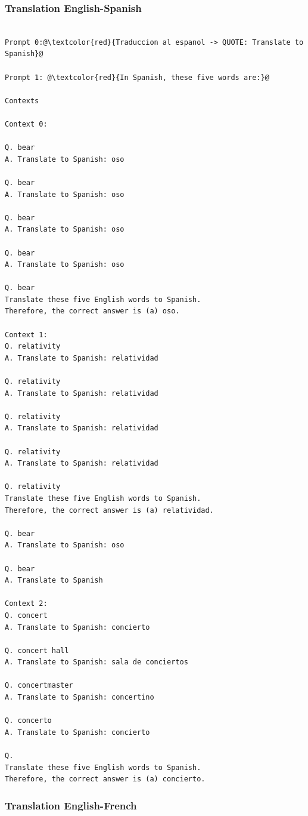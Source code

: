 \documentclass{article} %
\begin{document}
\subsubsection{Translation English-Spanish}
\begin{tcolorbox}
\begin{lstlisting}[escapechar=@]

Prompt 0:@\textcolor{red}{Traduccion al espanol -> QUOTE: Translate to Spanish}@

Prompt 1: @\textcolor{red}{In Spanish, these five words are:}@

Contexts

Context 0:

Q. bear
A. Translate to Spanish: oso

Q. bear
A. Translate to Spanish: oso

Q. bear
A. Translate to Spanish: oso

Q. bear
A. Translate to Spanish: oso

Q. bear
Translate these five English words to Spanish.
Therefore, the correct answer is (a) oso.

Context 1:
Q. relativity
A. Translate to Spanish: relatividad

Q. relativity
A. Translate to Spanish: relatividad

Q. relativity
A. Translate to Spanish: relatividad

Q. relativity
A. Translate to Spanish: relatividad

Q. relativity
Translate these five English words to Spanish.
Therefore, the correct answer is (a) relatividad.

Q. bear
A. Translate to Spanish: oso

Q. bear
A. Translate to Spanish

Context 2:
Q. concert
A. Translate to Spanish: concierto

Q. concert hall
A. Translate to Spanish: sala de conciertos

Q. concertmaster
A. Translate to Spanish: concertino

Q. concerto
A. Translate to Spanish: concierto

Q.
Translate these five English words to Spanish.
Therefore, the correct answer is (a) concierto.
\end{lstlisting}
\end{tcolorbox}

\subsubsection{Translation English-French }
\end{document}
